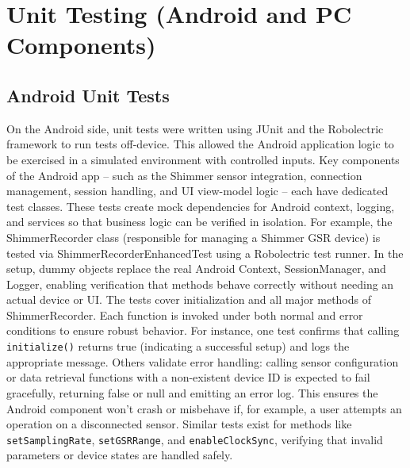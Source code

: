 \documentclass[11pt,a4paper]{report}
\begin{document}
\section{Unit Testing (Android and PC Components)}

\subsection{Android Unit Tests}

On the Android side, unit tests were written using JUnit and the Robolectric framework to run tests off-device. This allowed the Android application logic to be exercised in a simulated environment with controlled inputs. Key components of the Android app – such as the Shimmer sensor integration, connection management, session handling, and UI view-model logic – each have dedicated test classes. These tests create mock dependencies for Android context, logging, and services so that business logic can be verified in isolation. For example, the ShimmerRecorder class (responsible for managing a Shimmer GSR device) is tested via ShimmerRecorderEnhancedTest using a Robolectric test runner. In the setup, dummy objects replace the real Android Context, SessionManager, and Logger, enabling verification that methods behave correctly without needing an actual device or UI. The tests cover initialization and all major methods of ShimmerRecorder. Each function is invoked under both normal and error conditions to ensure robust behavior. For instance, one test confirms that calling \texttt{initialize()} returns true (indicating a successful setup) and logs the appropriate message. Others validate error handling: calling sensor configuration or data retrieval functions with a non-existent device ID is expected to fail gracefully, returning false or null and emitting an error log. This ensures the Android component won't crash or misbehave if, for example, a user attempts an operation on a disconnected sensor. Similar tests exist for methods like \texttt{setSamplingRate}, \texttt{setGSRRange}, and \texttt{enableClockSync}, verifying that invalid parameters or device states are handled safely.
\end{document}
